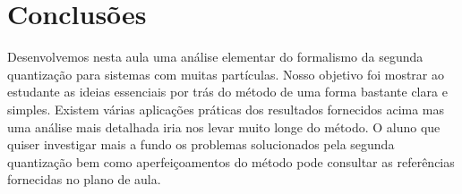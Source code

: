 \documentclass{article}
\begin{document}
\section{Conclusões}

Desenvolvemos nesta aula uma análise elementar do formalismo da segunda quantização para sistemas com muitas partículas. Nosso objetivo foi mostrar ao estudante as ideias essenciais por trás do método de uma forma bastante clara e simples. Existem várias aplicações práticas dos resultados fornecidos acima mas uma análise mais detalhada iria nos levar muito longe do método. O aluno que quiser investigar mais a fundo os problemas solucionados pela segunda quantização bem como aperfeiçoamentos do método pode consultar as referências fornecidas no plano de aula.
\end{document}
